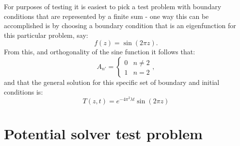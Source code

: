 \documentclass[11pt,letterpaper]{article}
\begin{document}
For purposes of testing it is easiest to pick a test problem with boundary conditions that are represented by a finite sum - one way this can be accomplished is by choosing a boundary condition that is an eigenfunction for this particular problem, say:
\begin{equation}
 f(z) = \sin(2 \pi z).
\end{equation}
From this, and orthogonality of the sine function it follows that:
\begin{equation}
A_{n'} = \left\{ \begin{array}{cc} 0 & n \ne 2 \\ 1 & n=2  \end{array} \right. ,
\end{equation}
and that the general solution for this specific set of boundary and initial conditions is:  
\begin{equation}
T(z,t) = e^{-4 \pi^2 \lambda t} \sin \left( 2 \pi z \right)
\end{equation}



\section{Potential solver test problem}
\end{document}
